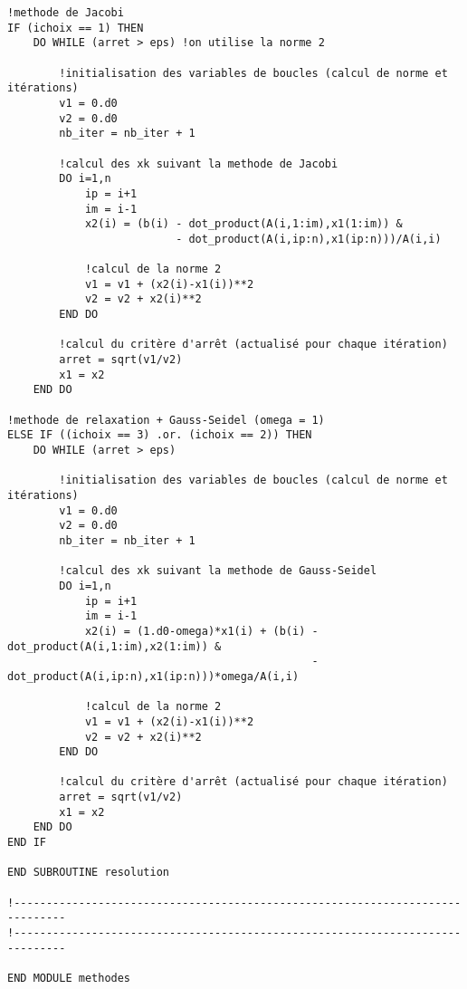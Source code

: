 \documentclass{report}
\begin{document}
\begin{small}
\begin{verbatim}
!methode de Jacobi
IF (ichoix == 1) THEN
    DO WHILE (arret > eps) !on utilise la norme 2

        !initialisation des variables de boucles (calcul de norme et itérations)
        v1 = 0.d0
        v2 = 0.d0
        nb_iter = nb_iter + 1

        !calcul des xk suivant la methode de Jacobi
        DO i=1,n
            ip = i+1
            im = i-1
            x2(i) = (b(i) - dot_product(A(i,1:im),x1(1:im)) &
                          - dot_product(A(i,ip:n),x1(ip:n)))/A(i,i)

            !calcul de la norme 2
            v1 = v1 + (x2(i)-x1(i))**2
            v2 = v2 + x2(i)**2
        END DO

        !calcul du critère d'arrêt (actualisé pour chaque itération)
        arret = sqrt(v1/v2)
        x1 = x2
    END DO

!methode de relaxation + Gauss-Seidel (omega = 1)
ELSE IF ((ichoix == 3) .or. (ichoix == 2)) THEN
    DO WHILE (arret > eps)

        !initialisation des variables de boucles (calcul de norme et itérations)
        v1 = 0.d0
        v2 = 0.d0
        nb_iter = nb_iter + 1

        !calcul des xk suivant la methode de Gauss-Seidel
        DO i=1,n
            ip = i+1
            im = i-1
            x2(i) = (1.d0-omega)*x1(i) + (b(i) - dot_product(A(i,1:im),x2(1:im)) &
                                               - dot_product(A(i,ip:n),x1(ip:n)))*omega/A(i,i)

            !calcul de la norme 2
            v1 = v1 + (x2(i)-x1(i))**2
            v2 = v2 + x2(i)**2
        END DO

        !calcul du critère d'arrêt (actualisé pour chaque itération)
        arret = sqrt(v1/v2)
        x1 = x2
    END DO
END IF

END SUBROUTINE resolution

!------------------------------------------------------------------------------
!------------------------------------------------------------------------------

END MODULE methodes
\end{verbatim}
\end{small}
\end{document}
